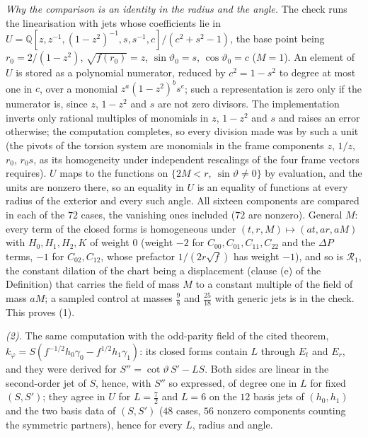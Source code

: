 \emph{Why the comparison is an identity in the radius and the angle.} The check runs the linearisation with jets whose coefficients lie in $U = \mathbb{Q}[z, z^{-1}, (1 - z^{2})^{-1}, s, s^{-1}, c]/(c^{2} + s^{2} - 1)$, the base point being $r_{0} = 2/(1 - z^{2})$, $\sqrt{f(r_{0})} = z$, $\sin\vartheta_{0} = s$, $\cos\vartheta_{0} = c$ ($M = 1$). An element of $U$ is stored as a polynomial numerator, reduced by $c^{2} = 1 - s^{2}$ to degree at most one in $c$, over a monomial $z^{a}(1 - z^{2})^{b}s^{e}$; such a representation is zero only if the numerator is, since $z$, $1 - z^{2}$ and $s$ are not zero divisors. The implementation inverts only rational multiples of monomials in $z$, $1 - z^{2}$ and $s$ and raises an error otherwise; the computation completes, so every division made was by such a unit (the pivots of the torsion system are monomials in the frame components $z$, $1/z$, $r_{0}$, $r_{0}s$, as its homogeneity under independent rescalings of the four frame vectors requires). $U$ maps to the functions on $\{2M < r,\ \sin\vartheta \neq 0\}$ by evaluation, and the units are nonzero there, so an equality in $U$ is an equality of functions at every radius of the exterior and every such angle. All sixteen components are compared in each of the $72$ cases, the vanishing ones included ($72$ are nonzero). General $M$: every term of the closed forms is homogeneous under $(t, r, M) \mapsto (at, ar, aM)$ with $H_{0}, H_{1}, H_{2}, K$ of weight $0$ (weight $-2$ for $C_{00}, C_{01}, C_{11}, C_{22}$ and the $\Delta P$ terms, $-1$ for $C_{02}, C_{12}$, whose prefactor $1/(2r\sqrt f)$ has weight $-1$), and so is $\mathcal{R}_{1}$, the constant dilation of the chart being a displacement (clause (e) of the Definition) that carries the field of mass $M$ to a constant multiple of the field of mass $aM$; a sampled control at masses $\tfrac98$ and $\tfrac{25}{18}$ with generic jets is in the check. This proves (1).

\emph{(2).} The same computation with the odd-parity field of the cited theorem, $k_{\varphi} = S(f^{-1/2}h_{0}\gamma_{0} - f^{1/2}h_{1}\gamma_{1})$: its closed forms contain $L$ through $E_{t}$ and $E_{r}$, and they were derived for $S'' = \cot\vartheta\,S' - LS$. Both sides are linear in the second-order jet of $S$, hence, with $S''$ so expressed, of degree one in $L$ for fixed $(S, S')$; they agree in $U$ for $L = \tfrac72$ and $L = 6$ on the $12$ basis jets of $(h_{0}, h_{1})$ and the two basis data of $(S, S')$ ($48$ cases, $56$ nonzero components counting the symmetric partners), hence for every $L$, radius and angle.

